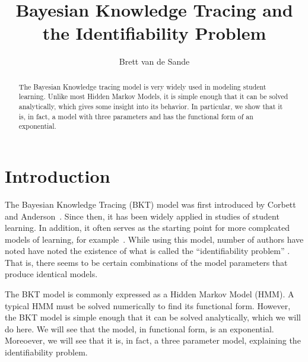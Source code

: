\documentclass[11pt,letterpaper]{article}
\begin{document}
\title{Bayesian Knowledge Tracing and the Identifiability Problem}
\author{Brett van de Sande}

\begin{abstract}
The Bayesian Knowledge tracing model is very widely used in
modeling student learning.  Unlike most Hidden Markov Models,
it is simple enough that it can be solved analytically, which
gives some insight into its behavior.  In particular, we show that
it is, in fact, a model with three parameters and has the 
functional form of an exponential.
\end{abstract}

\maketitle


\section{Introduction}

The Bayesian Knowledge Tracing (BKT) model was first introduced by Corbett
and Anderson~\cite{anderson}.  Since then, it has been widely applied
in
studies of student learning.  In addition, it often serves as the starting
%
%
point for more complcated models of learning, for example~\cite{bca,brunskill}.  
While using this model,  number of authors have noted have noted the 
existence of what is called the ``identifiability problem'' \cite{beckchang}.    
That is, there seems to be certain combinations of the model 
parameters that produce identical models.   

The BKT model is commonly expressed as a Hidden Markov Model (HMM).
A typical HMM must be solved numerically to find its functional form.
However, the BKT model is simple enough that it can be solved analytically,
which we will do here.  We will see that the model, in functional
form, is an exponential.  Moreoever, we will see that it is, in fact,
a three parameter model, explaining the identifiability problem.

\end{document}
